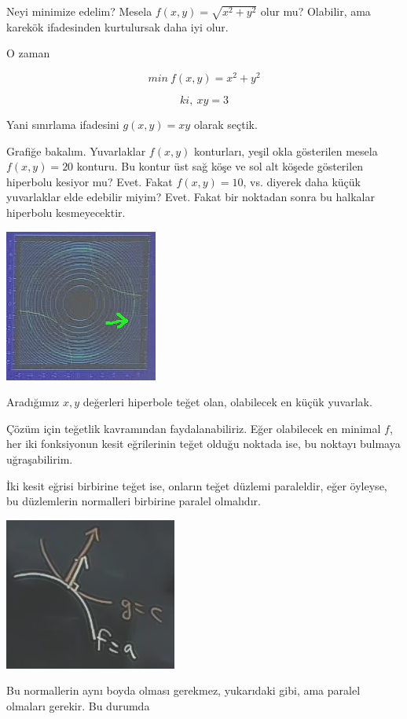 \documentclass[12pt,fleqn]{article}\usepackage{../../common}
\begin{document}
Neyi minimize edelim? Mesela $f(x,y) = \sqrt{x^2 + y^2}$ olur mu? Olabilir,
ama karekök ifadesinden kurtulursak daha iyi olur. 

O zaman

$$ min \ f(x,y) = x^2 + y^2 $$

$$ ki, \ xy = 3  $$

Yani sınırlama ifadesini $g(x,y) = xy$ olarak seçtik. 

Grafiğe bakalım. Yuvarlaklar $f(x,y)$ konturları, yeşil okla gösterilen
mesela $f(x,y) = 20$ konturu. Bu kontur üst sağ köşe ve sol alt köşede
gösterilen hiperbolu kesiyor mu? Evet. Fakat $f(x,y) = 10$, vs. diyerek
daha küçük yuvarlaklar elde edebilir miyim? Evet. Fakat bir noktadan sonra
bu halkalar hiperbolu kesmeyecektir. 

\includegraphics[height=5cm]{13_2.png}

Aradığımız $x,y$ değerleri hiperbole teğet olan, olabilecek en küçük
yuvarlak.

Çözüm için teğetlik kavramından faydalanabiliriz. Eğer olabilecek en
minimal $f$, her iki fonksiyonun kesit eğrilerinin teğet olduğu noktada
ise, bu noktayı bulmaya uğraşabilirim. 

İki kesit eğrisi birbirine teğet ise, onların teğet düzlemi paraleldir,
eğer öyleyse, bu düzlemlerin normalleri birbirine paralel olmalıdır. 

\includegraphics[height=5cm]{13_3.png}

Bu normallerin aynı boyda olması gerekmez, yukarıdaki gibi, ama paralel
olmaları gerekir. Bu durumda 
\end{document}
